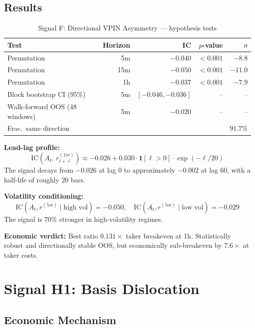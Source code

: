 \documentclass[12pt, a4paper]{article}
\theoremstyle{definition}
\newcommand{\IC}{\mathrm{IC}}
\begin{document}
\subsection{Results}

\begin{table}[H]
\centering
\caption{Signal F: Directional VPIN Asymmetry — hypothesis tests}
\begin{tabular}{lrrrr}
\toprule
Test & Horizon & IC & $p$-value & $\sigma$ \\
\midrule
Permutation & 5m  & $-0.040$ & $<0.001$ & $-8.8$ \\
Permutation & 15m & $-0.050$ & $<0.001$ & $-11.0$ \\
Permutation & 1h  & $-0.037$ & $<0.001$ & $-7.9$ \\
Block bootstrap CI (95\%) & 5m & $[-0.046, -0.036]$ & -- & -- \\
Walk-forward OOS (48 windows) & 5m & $-0.020$ & -- & -- \\
\quad Frac.\ same direction & & & & $91.7\%$ \\
\bottomrule
\end{tabular}
\end{table}

\textbf{Lead-lag profile:}
\[
  \IC(A_t,\, r_{t+\ell}^{(1m)}) \approx -0.026 + 0.030 \cdot \mathbf{1}[\ell > 0] \cdot \exp(-\ell/20)
\]
The signal decays from $-0.026$ at lag 0 to approximately $-0.002$ at lag 60,
with a half-life of roughly 20 bars.

\textbf{Volatility conditioning:}
\[
  \IC(A_t, r^{(5m)} \mid \text{high vol}) = -0.050, \quad
  \IC(A_t, r^{(5m)} \mid \text{low vol})  = -0.029
\]
The signal is $70\%$ stronger in high-volatility regimes.

\textbf{Economic verdict:} Best ratio $0.131\times$ taker breakeven at 1h.
Statistically robust and directionally stable OOS, but economically
sub-breakeven by $7.6\times$ at taker costs.


\section{Signal H1: Basis Dislocation}
\label{sec:h1}

\subsection{Economic Mechanism}
\end{document}
